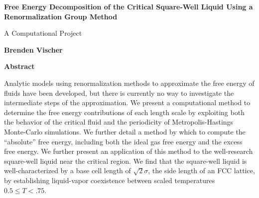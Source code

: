 \thispagestyle{plain}
\begin{center}
    \Large
    \textbf{Free Energy Decomposition of the Critical Square-Well Liquid Using a Renormalization Group Method}
   
    \vspace{0.8cm}
    \large
    A Computational Project
    
    \vspace{0.8cm}
    \textbf{Brenden Vischer}
    
    \vspace{1.2cm}
    \textbf{Abstract}
\end{center}

Analytic models using renormalization methods to approximate the free energy of fluids have been developed, but there is currently no way to investigate the intermediate steps of the approximation. We present a computational method to determine the free energy contributions of each length scale by exploiting both the behavior of the critical fluid and the periodicity of Metropolis-Hastings Monte-Carlo simulations. We further detail a method by which to compute the ``absolute'' free energy, including both the ideal gas free energy and the excess free energy. We further present an application of this method to the well-research square-well liquid near the critical region. We find that the square-well liquid is well-characterized by a base cell length of $\sqrt2\sigma$, the side length of an FCC lattice, by establishing liquid-vapor coexistence between scaled temperatures $0.5 \leq T < .75$.   
\clearpage